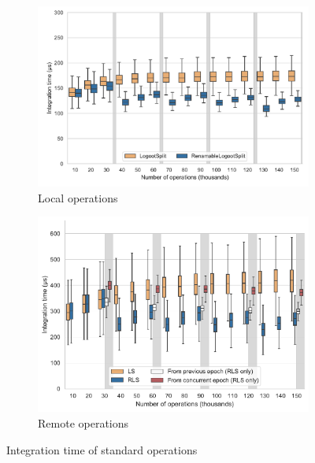 \documentclass[sigplan,10pt]{acmart}
\begin{document}
\begin{figure}[ht!]
    \begin{subfigure}{\columnwidth}
        \centering
        \includegraphics[width=0.9\columnwidth]{img/integration-time-boxplot-local-operations-without-outliers.pdf}
        \caption{Local operations}
        \label{fig:evolution-integration-time-local-insert}
    \end{subfigure}
    \begin{subfigure}{\columnwidth}
        \centering
        \includegraphics[width=0.9\columnwidth]{img/integration-time-boxplot-remote-operations-without-outliers.pdf}
        \caption{Remote operations}
        \label{fig:evolution-integration-time-remote-insert}
    \end{subfigure}
    \caption{Integration time of standard operations}
    \label{fig:evolution-integration-time-insert}
\end{figure}
\end{document}
